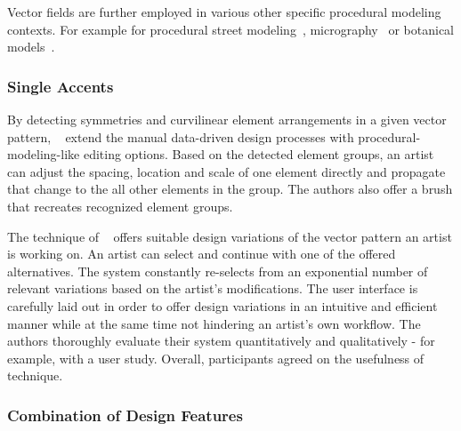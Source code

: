 
Vector fields are further employed in various other specific procedural modeling contexts. For example for procedural street modeling~\cite{chen_2008_ips}, micrography~\cite{maharik_2011_dm} or botanical models~\cite{xu_2015_ptm}.



\subsubsection{Single Accents}
\label{subsubsec:analysis_single_accents}

By detecting symmetries and curvilinear element arrangements in a given vector pattern, \citeauthor*{yeh_2009_dsa}~\cite{yeh_2009_dsa} extend the manual data-driven design processes with procedural-modeling-like editing options. Based on the detected element groups, an artist can adjust the spacing, location and scale of one element directly and propagate that change to the all other elements in the group. The authors also offer a brush that recreates recognized element groups.

The technique of \citeauthor*{guerrero_2016_pep}~\cite{guerrero_2016_pep} offers suitable design variations of the vector pattern an artist is working on. An artist can select and continue with one of the offered alternatives. The system constantly re-selects from an exponential number of relevant variations based on the artist's modifications. The user interface is carefully laid out in order to offer design variations in an intuitive and efficient manner while at the same time not hindering an artist's own workflow. The authors thoroughly evaluate their system quantitatively and qualitatively - for example, with a user study. Overall, participants agreed on the usefulness of technique.




\subsubsection{Combination of Design Features}
\label{subsubsec:analysis_combination_of_design_features}


